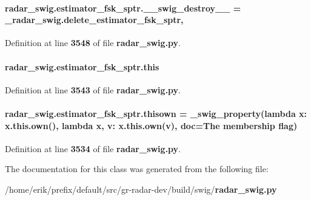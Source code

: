 \paragraph[{\+\_\+\+\_\+swig\+\_\+destroy\+\_\+\+\_\+}]{\setlength{\rightskip}{0pt plus 5cm}radar\+\_\+swig.\+estimator\+\_\+fsk\+\_\+sptr.\+\_\+\+\_\+swig\+\_\+destroy\+\_\+\+\_\+ = \+\_\+radar\+\_\+swig.\+delete\+\_\+estimator\+\_\+fsk\+\_\+sptr\hspace{0.3cm}{\ttfamily [static]}, {\ttfamily [private]}}\label{classradar__swig_1_1estimator__fsk__sptr_af51ef3f7902d4e3e70a53726d2e1912f}


Definition at line {\bf 3548} of file {\bf radar\+\_\+swig.\+py}.

\paragraph[{this}]{\setlength{\rightskip}{0pt plus 5cm}radar\+\_\+swig.\+estimator\+\_\+fsk\+\_\+sptr.\+this}\label{classradar__swig_1_1estimator__fsk__sptr_aa918c03409712e85b2cf60e3f93fdcc1}


Definition at line {\bf 3543} of file {\bf radar\+\_\+swig.\+py}.

\paragraph[{thisown}]{\setlength{\rightskip}{0pt plus 5cm}radar\+\_\+swig.\+estimator\+\_\+fsk\+\_\+sptr.\+thisown = {\bf \+\_\+swig\+\_\+property}(lambda x\+: x.\+this.\+own(), lambda {\bf x}, v\+: x.\+this.\+own(v), doc=\textquotesingle{}The membership flag\textquotesingle{})\hspace{0.3cm}{\ttfamily [static]}}\label{classradar__swig_1_1estimator__fsk__sptr_a06b5562b8a0d33475963e10093ff2d44}


Definition at line {\bf 3534} of file {\bf radar\+\_\+swig.\+py}.



The documentation for this class was generated from the following file\+:\begin{DoxyCompactItemize}
\item 
/home/erik/prefix/default/src/gr-\/radar-\/dev/build/swig/{\bf radar\+\_\+swig.\+py}\end{DoxyCompactItemize}
